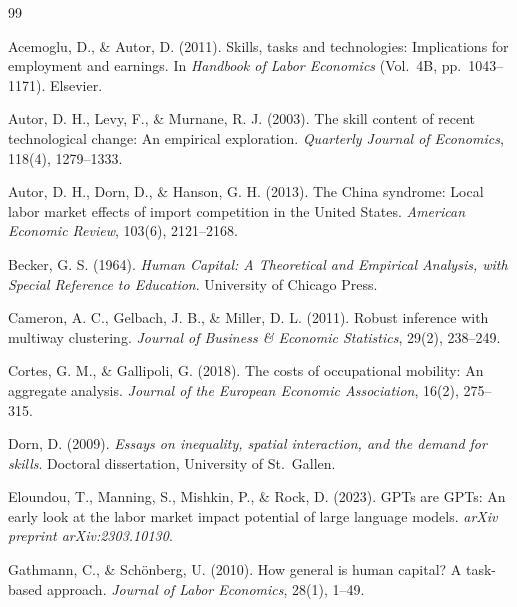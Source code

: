 \documentclass[12pt]{article}
\begin{document}

\begin{thebibliography}{99}

Acemoglu, D., \& Autor, D. (2011).
Skills, tasks and technologies: Implications for employment and earnings.
In \textit{Handbook of Labor Economics} (Vol.\ 4B, pp.\ 1043--1171). Elsevier.

Autor, D. H., Levy, F., \& Murnane, R. J. (2003).
The skill content of recent technological change: An empirical exploration.
\textit{Quarterly Journal of Economics}, 118(4), 1279--1333.

Autor, D. H., Dorn, D., \& Hanson, G. H. (2013).
The China syndrome: Local labor market effects of import competition in the United States.
\textit{American Economic Review}, 103(6), 2121--2168.

Becker, G. S. (1964).
\textit{Human Capital: A Theoretical and Empirical Analysis, with Special Reference to Education}.
University of Chicago Press.

Cameron, A. C., Gelbach, J. B., \& Miller, D. L. (2011).
Robust inference with multiway clustering.
\textit{Journal of Business \& Economic Statistics}, 29(2), 238--249.

Cortes, G. M., \& Gallipoli, G. (2018).
The costs of occupational mobility: An aggregate analysis.
\textit{Journal of the European Economic Association}, 16(2), 275--315.

Dorn, D. (2009).
\textit{Essays on inequality, spatial interaction, and the demand for skills}.
Doctoral dissertation, University of St.\ Gallen.

Eloundou, T., Manning, S., Mishkin, P., \& Rock, D. (2023).
GPTs are GPTs: An early look at the labor market impact potential of large language models.
\textit{arXiv preprint arXiv:2303.10130}.

Gathmann, C., \& Sch\"{o}nberg, U. (2010).
How general is human capital? A task-based approach.
\textit{Journal of Labor Economics}, 28(1), 1--49.


\end{thebibliography}
\end{document}
